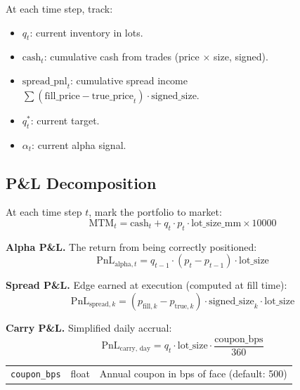 \documentclass[11pt,a4paper]{article}
\begin{document}
At each time step, track:
\begin{itemize}[leftmargin=2em]
  \item $q_t$: current inventory in lots.
  \item $\text{cash}_t$: cumulative cash from trades (price $\times$ size, signed).
  \item $\text{spread\_pnl}_t$: cumulative spread income $\sum (\text{fill\_price} - \text{true\_price}_t) \cdot \text{signed\_size}$.
  \item $q^*_t$: current target.
  \item $\alpha_t$: current alpha signal.
\end{itemize}

\subsection{P\&L Decomposition}

At each time step $t$, mark the portfolio to market:
\begin{equation}
\text{MTM}_t = \text{cash}_t + q_t \cdot p_t \cdot \text{lot\_size\_mm} \times 10000
\end{equation}

\textbf{Alpha P\&L.} The return from being correctly positioned:
\begin{equation}
\text{PnL}_{\text{alpha}, t} = q_{t-1} \cdot (p_t - p_{t-1}) \cdot \text{lot\_size}
\end{equation}

\textbf{Spread P\&L.} Edge earned at execution (computed at fill time):
\begin{equation}
\text{PnL}_{\text{spread}, k} = (p_{\text{fill},k} - p_{\text{true},k}) \cdot \text{signed\_size}_k \cdot \text{lot\_size}
\end{equation}

\textbf{Carry P\&L.} Simplified daily accrual:
\begin{equation}
\text{PnL}_{\text{carry, day}} = q_t \cdot \text{lot\_size} \cdot \frac{\text{coupon\_bps}}{360}
\end{equation}

\begin{parambox}[Knobs]
\begin{tabular}{@{}lll@{}}
\texttt{coupon\_bps} & float & Annual coupon in bps of face (default: 500) \\
\end{tabular}
\end{parambox}
\end{document}
